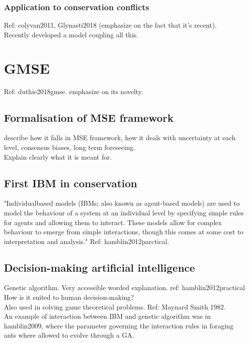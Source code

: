 \documentclass[12pt,a4paper]{article}
\begin{document}
\subsubsection{Application to conservation conflicts}
Ref: colyvan2011, Glynasti2018 (emphasize on the fact that it's recent).\\

Recently developed a model coupling all this.
\section{GMSE} Ref: duthie2018gmse. emphasize on its novelty.

\subsection{Formalisation of MSE framework}

describe how it falls in MSE framework, how it deals with uncertainty at each level, consensus biases, long term foreseeing.\\
Explain clearly what it is meant for.

\subsection{First IBM in conservation}

"Individualbased
models (IBMs; also known as agent-based models) are
used to model the behaviour of a system at an individual level
by specifying simple rules for agents and allowing them to
interact. These models allow for complex behaviour to emerge
from simple interactions, though this comes at some cost to
interpretation and analysis." Ref: hamblin2012parctical.

\subsection{Decision-making artificial intelligence}

Genetic algorithm. Very accessible worded explanation. ref: hamblin2012practical\\
How is it suited to human decision-making?\\
Also used in solving game theoretical problems. Ref: Maynard Smith 1982.\\
An example of interaction between IBM and genetic algorithm was in hamblin2009, where the parameter governing the interaction rules in foraging ants where allowed to evolve through a GA. 
\end{document}
